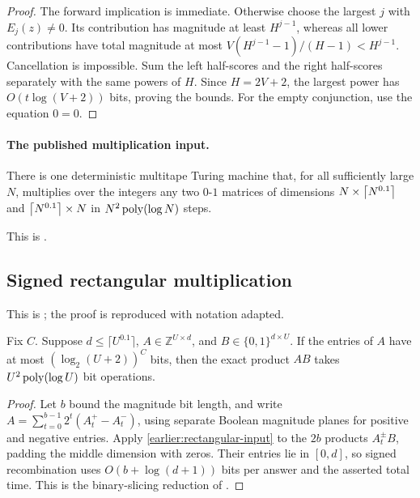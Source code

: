 \begin{proof}
The forward implication is immediate.  Otherwise choose the largest $j$
with $E_j(z)\ne0$.  Its contribution has magnitude at least $H^{j-1}$,
whereas all lower contributions have total magnitude at most
$V(H^{j-1}-1)/(H-1)<H^{j-1}$.  Cancellation is impossible.
Sum the left half-scores and the right half-scores separately with the
same powers of $H$.  Since $H=2V+2$, the largest power has
$O(t\log(V+2))$ bits, proving the bounds.  For the empty conjunction,
use the equation $0=0$.
\end{proof}

\paragraph{The published multiplication input.}
\begin{imported}[Williams]\label{earlier:rectangular-input}
There is one deterministic multitape Turing machine that, for all
sufficiently large \(N\), multiplies over the integers any two
\(0\)-\(1\) matrices of dimensions \(N\times\left\lceil N^{0.1}\right\rceil\) and
\(\left\lceil N^{0.1}\right\rceil\times N\) in \(N^2\operatorname{poly}(\log N)\) steps.
\end{imported}
This is \cite[Corollary~4.4 and Appendix~C]{WilACC14}.

\subsection{Signed rectangular multiplication}
This is \cite[Lemma~C.4]{Nag72}; the proof is reproduced with notation adapted.

\begin{lemma}
\label{earlier:alg-rectangular}
Fix $C$.  Suppose $d\le\lceil U^{0.1}\rceil$,
$A\in\mathbb Z^{U\times d}$, and $B\in\{0,1\}^{d\times U}$.
If the entries of $A$ have at most $(\log_2(U+2))^C$ bits, then the exact
product $AB$ takes $U^2\operatorname{poly}(\log U)$ bit operations.
\end{lemma}

\begin{proof}
Let $b$ bound the magnitude bit length, and write
$A=\sum_{t=0}^{b-1}2^t(A_t^+-A_t^-)$, using separate Boolean magnitude
planes for positive and negative entries.  Apply \cref{earlier:rectangular-input} to
the $2b$ products $A_t^\pm B$, padding the middle dimension with zeros.
Their entries lie in $[0,d]$, so signed recombination uses
$O(b+\log(d+1))$ bits per answer and the asserted total time.  This is
the binary-slicing reduction of \cite[Lemma~B.2]{NagCubic}.
\end{proof}

